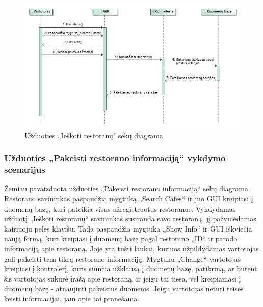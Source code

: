\documentclass{VUMIFPSkursinis}
\begin{document}
\begin{figure}[H]
	\centering
	\includegraphics[width=\textwidth,height=\textheight,keepaspectratio]{img/SearchCafes}
	\caption{Užduoties „Ieškoti restoranų" sekų diagrama}
	\label{img:SearchCafes}
\end{figure}

\subsubsection{Užduoties „Pakeisti restorano informaciją“ vykdymo scenarijus}
Žemiau pavaizduota užduoties „Pakeisti restorano informaciją“ sekų diagrama. Restorano savininkas paspaudžia mygtuką „Search Cafes“ ir juo GUI kreipiasi į duomenų bazę, kuri pateikia visus užregistruotus restoranus. Vykdydamas užduotį „Ieškoti restoranų“ savininkas susiranda savo restoraną, jį pažymėdamas kairiuoju pelės klavišu. Tada paspaudžia mygtuką „Show Info“ ir GUI iškviečia naują formą, kuri kreipiasi į duomenų bazę pagal restorano „ID“ ir parodo informaciją apie restoraną. Joje yra tušti laukai, kuriuos užpildydamas vartotojas gali pakeisti tam tikrą restorano informaciją. Mygtuku „Change“ vartotojas kreipiasi į kontrolerį, kuris siunčia užklausą į duomenų bazę, patikriną, ar būtent šis vartotojas sukūrė įrašą apie restoraną, ir jeigu tai tiesa, vėl kreipiamasi į duomenų bazę - atnaujinti pakeistus duomenis. Jeigu vartotojas neturi teisės keisti informacijai, jam apie tai pranešama.
\end{document}
